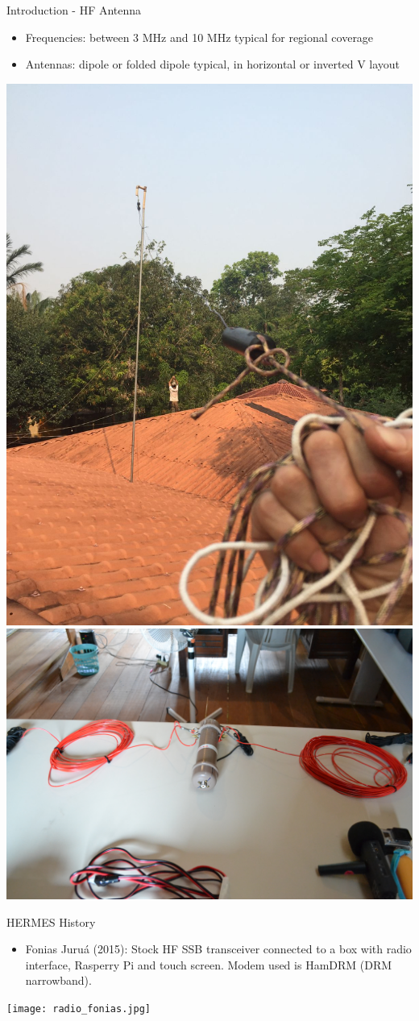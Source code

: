 \documentclass[aspectratio=169,xcolor={x11names,svgnames,dvipsnames}]{beamer}
\begin{document}
\begin{frame}{Introduction - HF Antenna}

  \begin{itemize}
  \item Frequencies: between 3 MHz and 10 MHz typical for regional coverage
  \item Antennas: dipole or folded dipole typical, in horizontal or inverted V layout
  \end{itemize}


  \begin{center}
    \includegraphics[width=.39\columnwidth]{antena.jpeg}
    \includegraphics[width=.51\columnwidth]{antena.jpg}
  \end{center}

\end{frame}


\begin{frame}{HERMES History}

  \begin{itemize}
    \item Fonias Juruá (2015): Stock HF SSB transceiver connected to a box with radio interface, Rasperry Pi and touch screen. Modem used is HamDRM (DRM narrowband).
  \end{itemize}
\begin{center}
  \texttt{[image: radio\_fonias.jpg]}
\end{center}

\end{frame}
\end{document}

